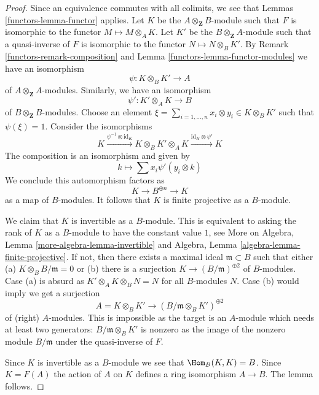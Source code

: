 \begin{proof}

Since an equivalence commutes with all colimits, we see that
Lemmas \ref{functors-lemma-functor} applies. Let $K$ be the
$A \otimes_\mathbf{Z} B$-module such that $F$ is
isomorphic to the functor $M \mapsto M \otimes_A K$.
Let $K'$ be the $B \otimes_\mathbf{Z} A$-module such that
a quasi-inverse of $F$ is
isomorphic to the functor $N \mapsto N \otimes_B K'$.
By Remark \ref{functors-remark-composition} and
Lemma \ref{functors-lemma-functor-modules} we have an isomorphism
$$
\psi : K \otimes_B K' \longrightarrow A
$$
of $A \otimes_\mathbf{Z} A$-modules.
Similarly, we have an isomorphism
$$
\psi' : K' \otimes_A K \longrightarrow B
$$
of $B \otimes_\mathbf{Z} B$-modules. Choose an element
$\xi = \sum_{i = 1, \ldots, n} x_i \otimes y_i \in K \otimes_B K'$
such that $\psi(\xi) = 1$. Consider the isomorphisms
$$
K \xrightarrow{\psi^{-1} \otimes \text{id}_K}
K \otimes_B K' \otimes_A K \xrightarrow{\text{id}_K \otimes \psi'} K
$$
The composition is an isomorphism and given by
$$
k \longmapsto \sum x_i \psi'(y_i \otimes k)
$$
We conclude this automorphism factors as
$$
K \to B^{\oplus n} \to K
$$
as a map of $B$-modules. It follows that $K$ is finite
projective as a $B$-module.

\medskip\noindent
We claim that $K$ is invertible as a $B$-module. This is equivalent
to asking the rank of $K$ as a $B$-module to have the constant value $1$,
see More on Algebra, Lemma \ref{more-algebra-lemma-invertible} and
Algebra, Lemma \ref{algebra-lemma-finite-projective}.
If not, then there exists a maximal ideal $\mathfrak m \subset B$
such that either (a) $K \otimes_B B/\mathfrak m = 0$ or
(b) there is a surjection $K \to (B/\mathfrak m)^{\oplus 2}$ of
$B$-modules. Case (a) is absurd as $K' \otimes_A K \otimes_B N = N$
for all $B$-modules $N$. Case (b) would imply we get a surjection
$$
A = K \otimes_B K' \longrightarrow (B/\mathfrak m \otimes_B K')^{\oplus 2}
$$
of (right) $A$-modules. This is impossible as the target is an $A$-module
which needs at least two generators: $B/\mathfrak m \otimes_B K'$
is nonzero as the image of the nonzero module $B/\mathfrak m$ under
the quasi-inverse of $F$.

\medskip\noindent
Since $K$ is invertible as a $B$-module we see that $\Hom_B(K, K) = B$.
Since $K = F(A)$ the action of $A$ on $K$ defines a ring isomorphism
$A \to B$. The lemma follows.
\end{proof}

